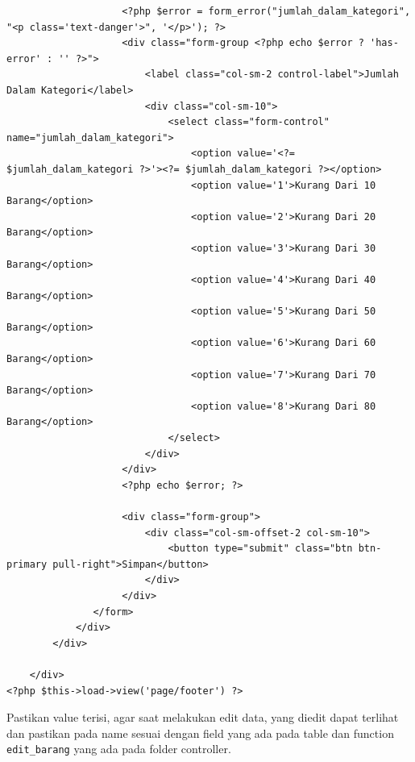 \begin{enumerate}
\begin{enumerate}
\begin{lstlisting}
                    <?php $error = form_error("jumlah_dalam_kategori", "<p class='text-danger'>", '</p>'); ?>
                    <div class="form-group <?php echo $error ? 'has-error' : '' ?>">
                        <label class="col-sm-2 control-label">Jumlah Dalam Kategori</label>
                        <div class="col-sm-10">
                            <select class="form-control" name="jumlah_dalam_kategori">
                                <option value='<?= $jumlah_dalam_kategori ?>'><?= $jumlah_dalam_kategori ?></option>
                                <option value='1'>Kurang Dari 10 Barang</option>
                                <option value='2'>Kurang Dari 20 Barang</option>
                                <option value='3'>Kurang Dari 30 Barang</option>
                                <option value='4'>Kurang Dari 40 Barang</option>
                                <option value='5'>Kurang Dari 50 Barang</option>
                                <option value='6'>Kurang Dari 60 Barang</option>
                                <option value='7'>Kurang Dari 70 Barang</option>
                                <option value='8'>Kurang Dari 80 Barang</option>
                            </select>
                        </div>
                    </div>
                    <?php echo $error; ?>

                    <div class="form-group">
                        <div class="col-sm-offset-2 col-sm-10">
                            <button type="submit" class="btn btn-primary pull-right">Simpan</button>
                        </div>
                    </div>
               </form>
            </div>
        </div>
        
    </div>
<?php $this->load->view('page/footer') ?>
\end{lstlisting}
    		\par Pastikan value terisi, agar saat melakukan edit data, yang diedit dapat terlihat dan pastikan pada name sesuai dengan field yang ada pada table dan function \verb|edit_barang| yang ada pada folder controller.
    		

\end{enumerate}
\end{enumerate}
